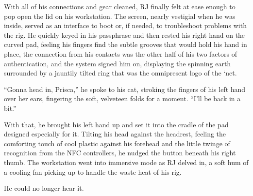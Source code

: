 With all of his connections and gear cleaned, RJ finally felt at ease enough to pop open the lid on his workstation.  The screen, nearly vestigial when he was inside, served as an interface to boot or, if needed, to troubleshoot problems with the rig.  He quickly keyed in his passphrase and then rested his right hand on the curved pad, feeling his fingers find the subtle grooves that would hold his hand in place, the connection from his contacts was the other half of his two factors of authentication, and the system signed him on, displaying the spinning earth surrounded by a jauntily tilted ring that was the omnipresent logo of the `net.

``Gonna head in, Prisca,'' he spoke to his cat, stroking the fingers of his left hand over her ears, fingering the soft, velveteen folds for a moment.  ``I'll be back in a bit.''

With that, he brought his left hand up and set it into the cradle of the pad designed especially for it.  Tilting his head against the headrest, feeling the comforting touch of cool plastic against his forehead and the little twinge of recognition from the NFC controllers, he nudged the button beneath his right thumb.  The workstation went into immersive mode as RJ delved in, a soft hum of a cooling fan picking up to handle the waste heat of his rig.

He could no longer hear it.
